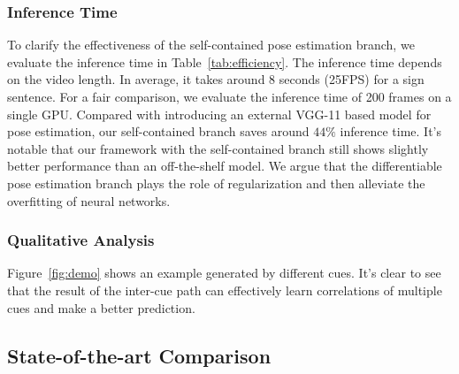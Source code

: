 \documentclass[letterpaper]{article} %
\begin{document}
\subsubsection{Inference Time} 
To clarify the effectiveness of the self-contained pose estimation branch, we evaluate the inference time in Table~\ref{tab:efficiency}. The inference time depends on the video length. In average, it takes around 8 seconds (25FPS) for a sign sentence. For a fair comparison, we evaluate the inference time of 200 frames on a single GPU. Compared with introducing an external VGG-11 based model for pose estimation, our self-contained branch saves around $44\%$ inference time. It's notable that our framework with the self-contained branch still shows slightly better performance than an off-the-shelf model. We argue that the differentiable pose estimation branch plays the role of regularization and then alleviate the overfitting of neural networks. 

\subsubsection{Qualitative Analysis}
Figure~\ref{fig:demo} shows an example generated by different cues. It's clear to see that the result of the inter-cue path can effectively learn correlations of multiple cues and make a better prediction.

\subsection{State-of-the-art Comparison}
\end{document}
